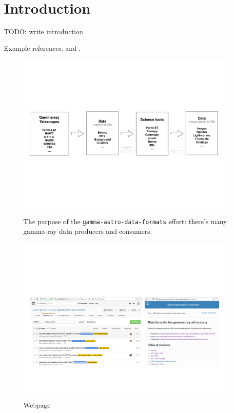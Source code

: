 \section{Introduction}

TODO: write introduction.

Example references: \cite{2015arXiv150907408D} and \citep{2016arXiv160600393K}.

\begin{figure}[tb]
  \centerline{\includegraphics[width=\textwidth]{figures/purpose}}
  \caption{The purpose of the \texttt{gamma-astro-data-formats} effort: there's
  many gamma-ray data producers and consumers.}
\end{figure}

\begin{figure}[tb]
  \centerline{\includegraphics[width=\textwidth]{figures/webpage}}
  \caption{Webpage}
\end{figure}

